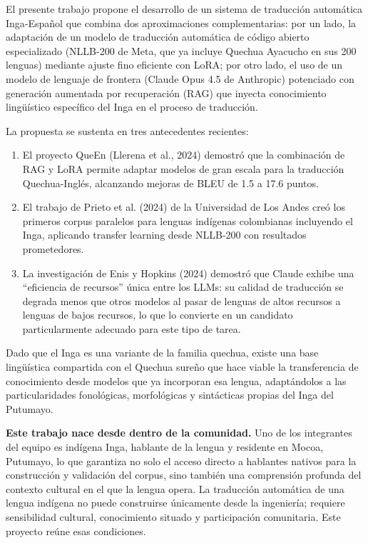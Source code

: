 \documentclass[12pt,a4paper]{article}
\begin{document}
El presente trabajo propone el desarrollo de un sistema de traducción automática Inga-Español que combina dos aproximaciones complementarias: por un lado, la adaptación de un modelo de traducción automática de código abierto especializado (NLLB-200 de Meta, que ya incluye Quechua Ayacucho en sus 200 lenguas) mediante ajuste fino eficiente con LoRA; por otro lado, el uso de un modelo de lenguaje de frontera (Claude Opus 4.5 de Anthropic) potenciado con generación aumentada por recuperación (RAG) que inyecta conocimiento lingüístico específico del Inga en el proceso de traducción.

La propuesta se sustenta en tres antecedentes recientes:

\begin{enumerate}
    \item El proyecto QueEn (Llerena et al., 2024) demostró que la combinación de RAG y LoRA permite adaptar modelos de gran escala para la traducción Quechua-Inglés, alcanzando mejoras de BLEU de 1.5 a 17.6 puntos.

    \item El trabajo de Prieto et al. (2024) de la Universidad de Los Andes creó los primeros corpus paralelos para lenguas indígenas colombianas incluyendo el Inga, aplicando transfer learning desde NLLB-200 con resultados prometedores.

    \item La investigación de Enis y Hopkins (2024) demostró que Claude exhibe una ``eficiencia de recursos'' única entre los LLMs: su calidad de traducción se degrada menos que otros modelos al pasar de lenguas de altos recursos a lenguas de bajos recursos, lo que lo convierte en un candidato particularmente adecuado para este tipo de tarea.
\end{enumerate}

Dado que el Inga es una variante de la familia quechua, existe una base lingüística compartida con el Quechua sureño que hace viable la transferencia de conocimiento desde modelos que ya incorporan esa lengua, adaptándolos a las particularidades fonológicas, morfológicas y sintácticas propias del Inga del Putumayo.

\textbf{Este trabajo nace desde dentro de la comunidad.} Uno de los integrantes del equipo es indígena Inga, hablante de la lengua y residente en Mocoa, Putumayo, lo que garantiza no solo el acceso directo a hablantes nativos para la construcción y validación del corpus, sino también una comprensión profunda del contexto cultural en el que la lengua opera. La traducción automática de una lengua indígena no puede construirse únicamente desde la ingeniería; requiere sensibilidad cultural, conocimiento situado y participación comunitaria. Este proyecto reúne esas condiciones.
\end{document}
